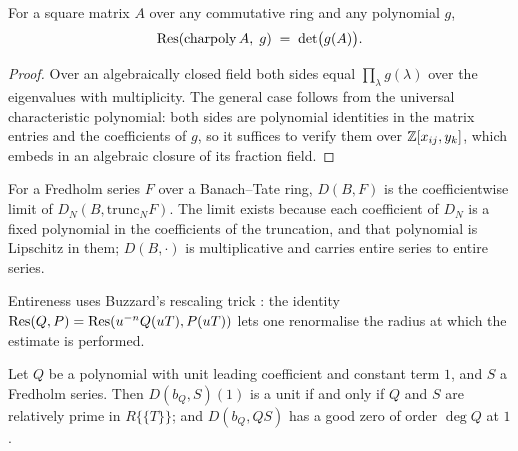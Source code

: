 \begin{proposition}
  \label{prop:resultant-charpoly}
  \leanok
  For a square matrix $A$ over any commutative ring and any polynomial $g$,
  \[
    \operatorname{Res}(\mathrm{charpoly}\,A,\; g) \;=\; \det\bigl(g(A)\bigr).
  \]
\end{proposition}

\begin{proof}
  \leanok
  Over an algebraically closed field both sides equal $\prod_\lambda g(\lambda)$ over the
  eigenvalues with multiplicity.  The general case follows from the universal characteristic
  polynomial: both sides are polynomial identities in the matrix entries and the coefficients of
  $g$, so it suffices to verify them over $\mathbb{Z}[x_{ij}, y_k]$, which embeds in an algebraic closure
  of its fraction field.
\end{proof}

\begin{definition}
  \label{def:dseries}
  \leanok
  For a Fredholm series $F$ over a Banach--Tate ring, $D(B,F)$ is the coefficientwise limit of
  $D_N(B, \mathrm{trunc}_N F)$.  The limit exists because each coefficient of $D_N$ is a fixed
  polynomial in the coefficients of the truncation, and that polynomial is Lipschitz in them;
  $D(B, \cdot)$ is multiplicative and carries entire series to entire series.
\end{definition}

Entireness uses Buzzard's rescaling trick \cite[p.~21]{Buzzard}: the identity
$\operatorname{Res}(Q,P) = \operatorname{Res}(u^{-n}Q(uT), P(uT))$ lets one renormalise the radius at which the estimate is
performed.

\begin{lemma}
  \label{lem:dseries-goodzero}
  \leanok
  Let $Q$ be a polynomial with unit leading coefficient and constant term $1$, and $S$ a
  Fredholm series.  Then $D(b_Q, S)(1)$ is a unit if and only if $Q$ and $S$ are relatively
  prime in $R\{\{T\}\}$; and $D(b_Q, QS)$ has a good zero of order $\deg Q$ at $1$.
\end{lemma}

